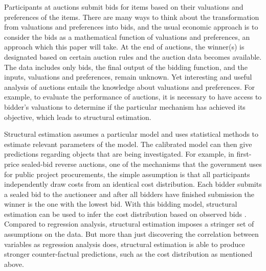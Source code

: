 \documentclass[11pt]{article}
\begin{document}



Participants at auctions submit bids for items based on their valuations and 
preferences of the items. There are many ways to think about the transformation from 
valuations and preferences into bids, and the usual economic approach is to consider 
the bids as a mathematical function of valuations and preferences, an approach which 
this paper will take. At the end of auctions, the winner(s) 
is designated based on certain auction rules and the auction data becomes available.
The data includes only bids, the final output of the bidding function, and the inputs, 
valuations and preferences, remain unknown. Yet interesting and useful analysis 
of auctions entails the knowledge about valuations and preferences. For example, 
to evaluate the performance of auctions, it is necessary to have access to bidder's 
valuations to determine if the particular mechanism has achieved its objective,
which leads to structural estimation. 

Structural estimation assumes a particular model and uses statistical methods to 
estimate relevant parameters of the model. The calibrated model can then 
give predictions regarding objects that are being investigated. For example, 
in first-price sealed-bid reverse auctions, 
one of the mechanisms that the government uses for public project procurements, 
the simple assumption is that all participants independently draw costs from an 
identical cost distribution. 
Each bidder submits a sealed bid to the auctioneer and after all bidders have finished 
submission the winner is the one with the lowest bid. With this bidding model, 
structural estimation can be used 
to infer the cost distribution based on observed bids \cite{Guerreetal2000}.
Compared to regression analysis, structural estimation imposes a stringer set of 
assumptions on the data. But more than just discovering the correlation between 
variables as regression analysis does, structural estimation is able to produce stronger 
counter-factual predictions, such as the cost distribution as mentioned above. 
\end{document}
